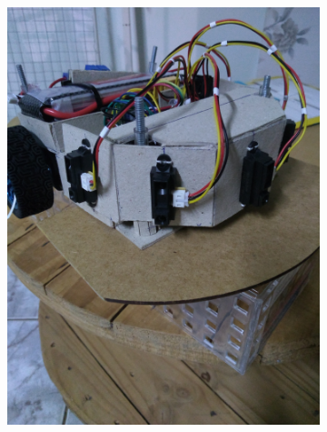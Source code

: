 \begin{figure}[!ht]
\centering
\caption{Robô após montagem}
\label{fig:RoboReal2}
	\begin{subfigure}[b]{0.49\textwidth}%
		\centering
		\includegraphics[trim={0cm 35cm 0cm 0cm}, clip, 
		scale=0.055]{Figuras/RoboMontagem5}
	\end{subfigure}
	~
	\begin{subfigure}[b]{0.49\textwidth}%
		\centering

\end{subfigure}
\end{figure}
